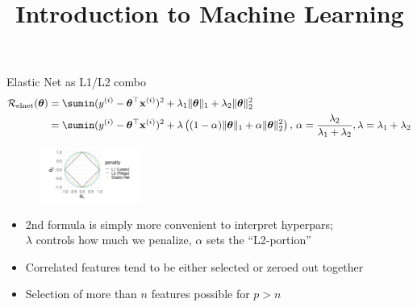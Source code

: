 \documentclass[11pt,compress,t,notes=noshow, xcolor=table]{beamer}
\title{Introduction to Machine Learning}
\begin{document}

\begin{vbframe}{Elastic Net as L1/L2 combo }
\vspace{-0.7cm}
\small{
\begin{align*}
\mathcal{R}_{\text{elnet}}(\thetav) &=  \sumin (\yi - \thetav^\top \xi)^2 + \lambda_1 \|\thetav\|_1 + \lambda_2 \|\thetav\|_2^2 \\
&= \sumin (\yi - \thetav^\top \xi)^2 + \lambda \left( (1-\alpha) \|\thetav\|_1 + \alpha \|\thetav\|_2^2\right),\, \alpha=\frac{\lambda_2}{\lambda_1+\lambda_2}, \lambda=\lambda_1+\lambda_2
\end{align*}}
\begin{figure}
\vspace{-0.3cm}
\includegraphics[width=0.3\textwidth]{figure/lasso_ridge_enet_2d.png}\\
\end{figure}
\vspace{-0.3cm}
\begin{itemize}
\item 2nd formula is simply more convenient to interpret hyperpars;\\
    $\lambda$ controls how much we penalize, $\alpha$ sets the ``L2-portion''
\item Correlated features tend to be either selected or zeroed out together
\item Selection of more than $n$ features possible for $p>n$
\end{itemize}
\end{vbframe}
\end{document}
